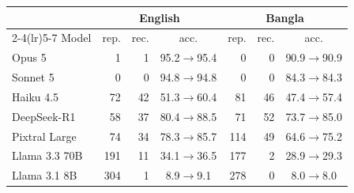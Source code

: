 \begin{tabular}{l rrc rrc}
\toprule
& \multicolumn{3}{c}{English} & \multicolumn{3}{c}{Bangla} \\
\cmidrule(lr){2-4}\cmidrule(lr){5-7}
Model & rep. & rec. & acc. & rep. & rec. & acc. \\
\midrule
Opus 5 & 1 & 1 & 95.2$\rightarrow$95.4 & 0 & 0 & 90.9$\rightarrow$90.9 \\
Sonnet 5 & 0 & 0 & 94.8$\rightarrow$94.8 & 0 & 0 & 84.3$\rightarrow$84.3 \\
Haiku 4.5 & 72 & 42 & 51.3$\rightarrow$60.4 & 81 & 46 & 47.4$\rightarrow$57.4 \\
DeepSeek-R1 & 58 & 37 & 80.4$\rightarrow$88.5 & 71 & 52 & 73.7$\rightarrow$85.0 \\
Pixtral Large & 74 & 34 & 78.3$\rightarrow$85.7 & 114 & 49 & 64.6$\rightarrow$75.2 \\
Llama 3.3 70B & 191 & 11 & 34.1$\rightarrow$36.5 & 177 & 2 & 28.9$\rightarrow$29.3 \\
Llama 3.1 8B & 304 & 1 & 8.9$\rightarrow$9.1 & 278 & 0 & 8.0$\rightarrow$8.0 \\
\bottomrule
\end{tabular}
